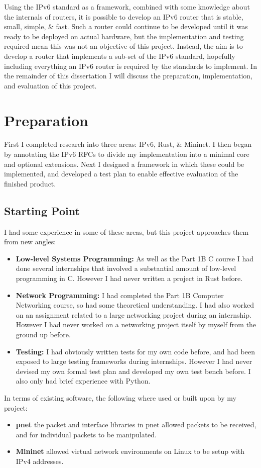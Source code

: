 \documentclass[12pt,a4paper,twoside,openright]{report}
\begin{document}
Using the IPv6 standard as a framework, combined with some knowledge about the internals of routers, it is possible to develop an IPv6 router that is stable, small, simple, \& fast.  Such a router could continue to be developed until it was ready to be deployed on actual hardware, but the implementation and testing required mean this was not an objective of this project.  Instead, the aim is to develop a router that implements a sub-set of the IPv6 standard, hopefully including everything an IPv6 router is required by the standards to implement.  In the remainder of this dissertation I will discuss the preparation, implementation, and evaluation of this project.

\chapter{Preparation}
\label{chap::preperation}

First I completed research into three areas: IPv6, Rust, \& Mininet. I then began by annotating the IPv6 RFCs\cite{ipv6_rfc}\cite{ipv6_rfc_adr}\cite{icmpv6_rfc} to divide my implementation into a minimal core and optional extensions. Next I designed a framework in which these could be implemented, and developed a test plan to enable effective evaluation of the finished product.

\section{Starting Point}
I had some experience in some of these areas, but this project approaches them from new angles:
\begin{itemize}
\item \textbf{Low-level Systems Programming:} As well as the Part 1B C course I had done several internships that involved a substantial amount of low-level programming in C. However I had never written a project in Rust before.
\item \textbf{Network Programming:} I had completed the Part 1B Computer Networking course, so had some theoretical understanding.  I had also worked on an assignment related to a large networking project during an internship.  However I had never worked on a networking project itself by myself from the ground up before.
\item \textbf{Testing:} I had obviously written tests for my own code before, and had been exposed to large testing frameworks during internships.  However I had never devised my own formal test plan and developed my own test bench before. I also only had brief experience with Python.
\end{itemize}
In terms of existing software, the following where used or built upon by my project:
\begin{itemize}
\item \textbf{pnet}\cite{pnet_rust} the packet and interface libraries in pnet allowed packets to be received, and for individual packets to be manipulated.
\item \textbf{Mininet}\cite{mininet} allowed virtual network environments on Linux to be setup with IPv4 addresses.
\end{itemize}
\end{document}
